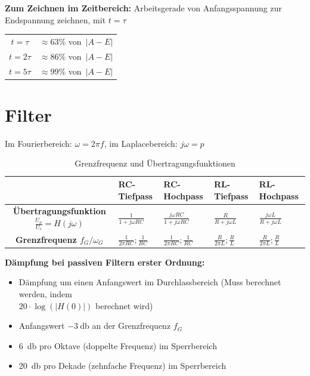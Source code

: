 \documentclass[a5paper, 12pt]{scrartcl}
\begin{document}
\textbf{Zum Zeichnen im Zeitbereich:} Arbeitsgerade von Anfangsspannung zur Endspannung zeichnen, mit \(t = \tau\)


\begin{table}
  \centering
  \begin{tabular}{cc}
    \toprule
    \(t=\tau\) & \(\approx 63\%\) von\ \(|A-E|\)\\
    \(t=2\tau\) & \(\approx 86\%\) von\ \(|A-E|\)\\
    \(t=5\tau\) & \(\approx 99\%\) von\ \(|A-E|\)\\
    \bottomrule
  \end{tabular}
\end{table}

\section{Filter}

Im Fourierbereich: \(\omega = 2 \pi f\), im Laplacebereich: \(j\omega = p\)

\begin{table}[H]
  \centering
  \begin{tabular}{cllll}
    \toprule
    & \textbf{RC-Tiefpass} & \textbf{RC-Hochpass} & \textbf{RL-Tiefpass} & \textbf{RL-Hochpass}\\
    \midrule
    \textbf{Übertragungsfunktion \(\frac{U_a}{U_e} = H(j\omega)\)} & \(\frac{1}{1 + j\omega R C}\) & \(\frac{j\omega RC}{1 + j\omega RC}\) & \(\frac{R}{R + j \omega L}\)& \(\frac{j\omega L}{R + j \omega L}\) \\[1em]
    \textbf{Grenzfrequenz \(f_G / \omega_G\)} & \(\frac{1}{2 \pi R C}; \frac{1}{RC}\) & \(\frac{1}{2 \pi R C}; \frac{1}{RC}\) & \(\frac{R}{2 \pi L}; \frac{R}{L}\) & \(\frac{R}{2 \pi L}; \frac{R}{L}\)\\
    \bottomrule
  \end{tabular}
  \caption{Grenzfrequenz und Übertragungsfunktionen}
\end{table}

\textbf{Dämpfung bei passiven Filtern erster Ordnung:}

\begin{itemize}
\item Dämpfung um einen Anfangswert im Durchlassbereich (Muss berechnet werden, indem\\ \(20 \cdot \log(|H(0)|)\) berechnet wird)
\item Anfangswert \(- \SI{3}{\decibel}\) an der Grenzfrequenz \(f_G\)
\item \SI{6}{\decibel} pro Oktave (doppelte Frequenz) im Sperrbereich
\item \SI{20}{\decibel} pro Dekade (zehnfache Frequenz) im Sperrbereich
\end{itemize}
\end{document}

